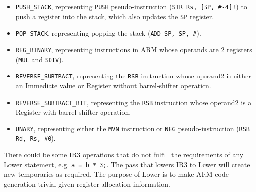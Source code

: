 \documentclass[nonacm, acmsmall, screen, 10pt]{acmart}
\begin{document}
\begin{itemize}
  \item \texttt{PUSH\_STACK}, representing \texttt{PUSH} pseudo-instruction (\texttt{STR Rs, [SP, \#-4]!}) to push a register into the stack, which also updates the \texttt{SP} register.
  \item \texttt{POP\_STACK}, representing popping the stack (\texttt{ADD SP, SP, \#<number of bytes>}).
  \item \texttt{REG\_BINARY}, representing instructions in ARM whose operands are 2 registers (\texttt{MUL} and \texttt{SDIV}).
  \item \texttt{REVERSE\_SUBTRACT}, representing the \texttt{RSB} instruction whose operand2 is either an Immediate value or Register without barrel-shifter operation.
  \item \texttt{REVERSE\_SUBTRACT\_BIT}, representing the \texttt{RSB} instruction whose operand2 is a Register with barrel-shifter operation.
  \item \texttt{UNARY}, representing either the \texttt{MVN} instruction or \texttt{NEG} pseudo-instruction (\texttt{RSB Rd, Rs, \#0}).
\end{itemize}

There could be some IR3 operations that do not fulfill the requirements of any Lower statement, e.g. \texttt{a = b * 3;}.
The pass that lowers IR3 to Lower will create new temporaries as required.
The purpose of Lower is to make ARM code generation trivial given register allocation information.
\end{document}
